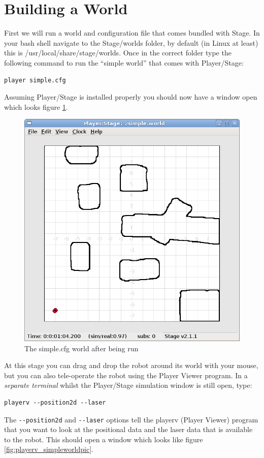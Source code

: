 \documentclass[a4paper]{article}
\newcommand{\plst}{Player/Stage\xspace}
\newcommand{\pl}{Player\xspace}
\begin{document}
\section{Building a World} \label{sec:BuildingAWorld}

First we will run a world and configuration file that comes bundled with Stage. In your bash shell navigate to the Stage/worlds folder, by default (in Linux at least) this is /usr/local/share/stage/worlds. Once in the correct folder type the following command to run the ``simple world'' that comes with \plst:
\begin{verbatim}
player simple.cfg
\end{verbatim}
Assuming \plst is installed properly you should now have a window open which looks figure \ref{fig:simpleworldpic}.
\begin{figure}
	\centering
	\includegraphics[width=0.8\linewidth]{./pics/simpleworld.png}
	\caption{The simple.cfg world after being run}
	\label{fig:simpleworldpic}
\end{figure}
At this stage you can drag and drop the robot around its world with your mouse, but you can also tele-operate the robot using the \pl Viewer program. In a \emph{separate terminal} whilst the \plst simulation window is still open, type:
\begin{verbatim}
playerv --position2d --laser
\end{verbatim}
The \verb|--position2d| and \verb|--laser| options tell the playerv (\pl Viewer) program that you want to look at the positional data and the laser data that is available to the robot. This should open a window which looks like figure \ref{fig:playerv_simpleworldpic}. 
\end{document}
